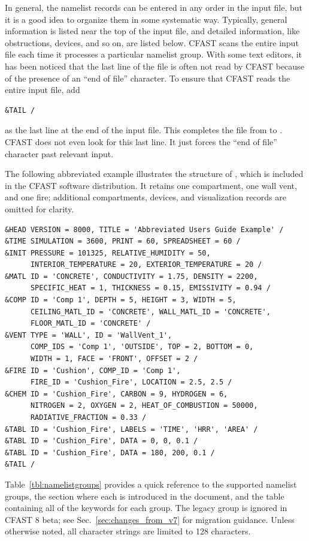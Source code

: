 In general, the namelist records can be entered in any order in the input file, but it is a good idea to organize them in some systematic way. Typically, general information is listed near the top of the input file, and detailed information, like obstructions, devices, and so on, are listed below. CFAST scans the entire input file each time it processes a particular namelist group. With some text editors, it has been noticed that the last line of the file is often not read by CFAST because of the presence of an ``end of file'' character. To ensure that CFAST reads the entire input file, add
\begin{lstlisting}
&TAIL /
\end{lstlisting}
as the last line at the end of the input file. This completes the file from  to . CFAST does not even look for this last line. It just forces the ``end of file'' character past relevant input.

The following abbreviated example illustrates the structure of , which is included in the CFAST software distribution. It retains one compartment, one wall vent, and one fire; additional compartments, devices, and visualization records are omitted for clarity.
\begin{lstlisting}
&HEAD VERSION = 8000, TITLE = 'Abbreviated Users Guide Example' /
&TIME SIMULATION = 3600, PRINT = 60, SPREADSHEET = 60 /
&INIT PRESSURE = 101325, RELATIVE_HUMIDITY = 50,
      INTERIOR_TEMPERATURE = 20, EXTERIOR_TEMPERATURE = 20 /
&MATL ID = 'CONCRETE', CONDUCTIVITY = 1.75, DENSITY = 2200,
      SPECIFIC_HEAT = 1, THICKNESS = 0.15, EMISSIVITY = 0.94 /
&COMP ID = 'Comp 1', DEPTH = 5, HEIGHT = 3, WIDTH = 5,
      CEILING_MATL_ID = 'CONCRETE', WALL_MATL_ID = 'CONCRETE',
      FLOOR_MATL_ID = 'CONCRETE' /
&VENT TYPE = 'WALL', ID = 'WallVent_1',
      COMP_IDS = 'Comp 1', 'OUTSIDE', TOP = 2, BOTTOM = 0,
      WIDTH = 1, FACE = 'FRONT', OFFSET = 2 /
&FIRE ID = 'Cushion', COMP_ID = 'Comp 1',
      FIRE_ID = 'Cushion_Fire', LOCATION = 2.5, 2.5 /
&CHEM ID = 'Cushion_Fire', CARBON = 9, HYDROGEN = 6,
      NITROGEN = 2, OXYGEN = 2, HEAT_OF_COMBUSTION = 50000,
      RADIATIVE_FRACTION = 0.33 /
&TABL ID = 'Cushion_Fire', LABELS = 'TIME', 'HRR', 'AREA' /
&TABL ID = 'Cushion_Fire', DATA = 0, 0, 0.1 /
&TABL ID = 'Cushion_Fire', DATA = 180, 200, 0.1 /
&TAIL /
\end{lstlisting}

Table~\ref{tbl:namelistgroups} provides a quick reference to the supported namelist groups, the section where each is introduced in the document, and the table containing all of the keywords for each group. The legacy  group is ignored in CFAST 8 beta; see Sec.~\ref{sec:changes_from_v7} for migration guidance. Unless otherwise noted, all  character strings are limited to 128 characters.

